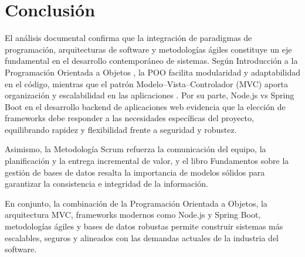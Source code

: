 \section{Conclusión}

El análisis documental confirma que la integración de paradigmas de programación, arquitecturas de software y metodologías ágiles constituye un eje fundamental en el desarrollo contemporáneo de sistemas. Según Introducción a la Programación Orientada a Objetos \cite{poo}, la POO facilita modularidad y adaptabilidad en el código, mientras que el patrón Modelo–Vista–Controlador (MVC) aporta organización y escalabilidad en las aplicaciones \cite{mvc}. Por su parte, Node.js vs Spring Boot en el desarrollo backend de aplicaciones web \cite{nodejs_springboot} evidencia que la elección de frameworks debe responder a las necesidades específicas del proyecto, equilibrando rapidez y flexibilidad frente a seguridad y robustez.

Asimismo, la Metodología Scrum \cite{scrum} refuerza la comunicación del equipo, la planificación y la entrega incremental de valor, y el libro Fundamentos sobre la gestión de bases de datos \cite{databases} resalta la importancia de modelos sólidos para garantizar la consistencia e integridad de la información.

En conjunto, la combinación de la Programación Orientada a Objetos, la arquitectura MVC, frameworks modernos como Node.js y Spring Boot, metodologías ágiles y bases de datos robustas permite construir sistemas más escalables, seguros y alineados con las demandas actuales de la industria del software.